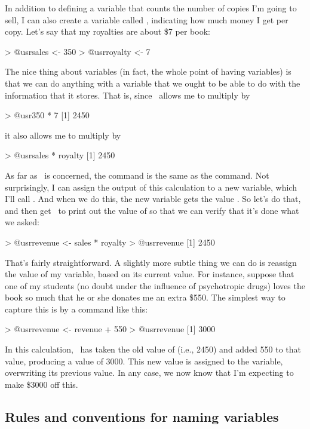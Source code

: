 In addition to defining a  variable that counts the number of copies I'm going to sell, I can also create a variable called , indicating how much money I get per copy. Let's say that my royalties are about \$7 per book:
\begin{rblock1}
> @usr{sales <- 350}
> @usr{royalty <- 7}
\end{rblock1}
The nice thing about variables (in fact, the whole point of having variables) is that we can do anything with a variable that we ought to be able to do with the information that it stores. That is, since \R\ allows me to multiply  by 
\begin{rblock1}
> @usr{350 * 7}
[1] 2450
\end{rblock1}
it also allows me to multiply  by 
\begin{rblock1}
> @usr{sales * royalty}
[1] 2450
\end{rblock1}
As far as \R\ is concerned, the  command is the same as the  command. Not surprisingly, I can assign the output of this calculation to a new variable, which I'll call . And when we do this, the new variable  gets the value . So let's do that, and then get \R\ to print out the value of  so that we can verify that it's done what we asked:
\begin{rblock1}
> @usr{revenue <- sales * royalty}
> @usr{revenue}
[1] 2450
\end{rblock1}
That's fairly straightforward. A slightly more subtle thing we can do is reassign the value of my variable, based on its current value. For instance, suppose that one of my students (no doubt under the influence of psychotropic drugs) loves the book so much that he or she donates me an extra \$550. The simplest way to capture this is by a command like this:
\begin{rblock1}
> @usr{revenue <- revenue + 550}
> @usr{revenue}
[1] 3000
\end{rblock1}
In this calculation, \R\ has taken the old value of  (i.e., 2450) and added 550 to that value, producing a value of 3000. This new value is assigned to the  variable, overwriting its previous value. In any case, we now know that I'm expecting to make \$3000 off this. 

\subsection{Rules and conventions for naming variables}

